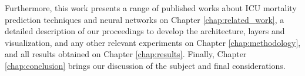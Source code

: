 
Furthermore, this work presents a range of published works about ICU mortality prediction techniques and neural networks on Chapter \ref{chap:related_work}, a detailed description of our proceedings to develop the architecture, layers and visualization, and any other relevant experiments on Chapter \ref{chap:methodology}, and all results obtained on Chapter \ref{chap:results}. Finally, Chapter \ref{chap:conclusion} brings our discussion of the subject and final considerations. 